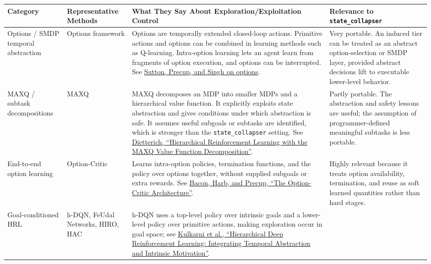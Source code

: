 \documentclass[11pt]{article}
\begin{document}
\begin{longtable}{
    >{\raggedright\arraybackslash}p{}
    >{\raggedright\arraybackslash}p{}
    >{\raggedright\arraybackslash}p{}
    >{\raggedright\arraybackslash}p{}
}
\toprule
\textbf{Category}
&
\textbf{Representative Methods}
&
\textbf{What They Say About Exploration/Exploitation Control}
&
\textbf{Relevance to \texttt{state\_collapser}}
\\
\midrule
\endhead

Options / SMDP temporal abstraction
&
Options framework
&
Options are temporally extended closed-loop actions. Primitive actions and
options can be combined in learning methods such as Q-learning. Intra-option
learning lets an agent learn from fragments of option execution, and options
can be interrupted. See
\href{https://www.sciencedirect.com/science/article/pii/S0004370299000521}
{Sutton, Precup, and Singh on options}.
&
Very portable. An induced tier can be treated as an abstract option-selection
or SMDP layer, provided abstract decisions lift to executable lower-level
behavior.
\\

\midrule

MAXQ / subtask decompositions
&
MAXQ
&
MAXQ decomposes an MDP into smaller MDPs and a hierarchical value function.
It explicitly exploits state abstraction and gives conditions under which
abstraction is safe. It assumes useful subgoals or subtasks are identified,
which is stronger than the \texttt{state\_collapser} setting. See
\href{https://www.jair.org/index.php/jair/article/view/10266}
{Dietterich, ``Hierarchical Reinforcement Learning with the MAXQ Value
Function Decomposition''}.
&
Partly portable. The abstraction and safety lessons are useful; the assumption
of programmer-defined meaningful subtasks is less portable.
\\

\midrule

End-to-end option learning
&
Option-Critic
&
Learns intra-option policies, termination functions, and the policy over
options together, without supplied subgoals or extra rewards. See
\href{https://arxiv.org/abs/1609.05140}
{Bacon, Harb, and Precup, ``The Option-Critic Architecture''}.
&
Highly relevant because it treats option availability, termination, and reuse
as soft learned quantities rather than hard stages.
\\

\midrule

Goal-conditioned HRL
&
h-DQN, FeUdal Networks, HIRO, HAC
&
h-DQN uses a top-level policy over intrinsic goals and a lower-level policy
over primitive actions, making exploration occur in goal space; see
\href{https://arxiv.org/abs/1604.06057}
{Kulkarni et al., ``Hierarchical Deep Reinforcement Learning: Integrating
Temporal Abstraction and Intrinsic Motivation''}.


\end{longtable}
\end{document}
